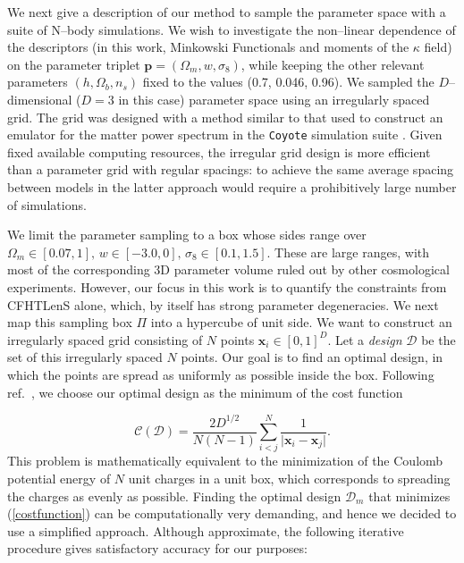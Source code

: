 \documentclass[reprint,aps,prd,superscriptaddress,showkeys,showpacs]{revtex4-1}
\begin{document}
We next give a description of our method to sample the parameter space
with a suite of N--body simulations. We wish to investigate the
non--linear dependence of the descriptors (in this work, Minkowski
Functionals and moments of the $\kappa$ field) on the parameter
triplet $\mathbf{p}=(\Omega_m,w,\sigma_8)$, while keeping the other
relevant parameters $(h,\Omega_b,n_s)$ fixed to the values (0.7,
0.046, 0.96). 
We sampled the $D$--dimensional ($D=3$ in this case) parameter space
using an irregularly spaced grid. The grid was designed with a method
similar to that used to construct an emulator for the matter power
spectrum in the \texttt{Coyote} simulation suite \citep{coyote2}.
Given fixed available computing resources, the irregular grid design
is more efficient than a parameter grid with regular spacings: to
achieve the same average spacing between models in the latter approach
would require a prohibitively large number of simulations.

We limit the parameter sampling to a box whose sides range over
$\Omega_m\in[0.07,1],\,w\in[-3.0,0],\,\sigma_8\in[0.1,1.5]$.  These
are large ranges, with most of the corresponding 3D parameter volume
ruled out by other cosmological experiments. However, our focus in
this work is to quantify the constraints from CFHTLenS alone, which,
by itself has strong parameter degeneracies.
We next map this sampling box $\Pi$ into a hypercube of unit side. We
want to construct an irregularly spaced grid consisting of $N$ points
$\mathbf{x}_i\in[0,1]^D$. Let a \textit{design} $\mathcal{D}$ be the
set of this irregularly spaced $N$ points. Our goal is to find an
optimal design, in which the points are spread as uniformly as
possible inside the box. Following ref.~\citep{coyote2}, we choose our
optimal design as the minimum of the cost function

\begin{equation}
\label{costfunction}
\mathcal{C}(\mathcal{D}) = \frac{2D^{1/2}}{N(N-1)}\sum_{i<j}^N\frac{1}{\vert\mathbf{x}_i-\mathbf{x}_j\vert}.
\end{equation} 
%
This problem is mathematically equivalent to the minimization of the
Coulomb potential energy of $N$ unit charges in a unit box, which
corresponds to spreading the charges as evenly as possible.
Finding the optimal design $\mathcal{D}_m$ that minimizes
(\ref{costfunction}) can be computationally very demanding, and hence
we decided to use a simplified approach. Although approximate, the
following iterative procedure gives satisfactory accuracy for our purposes:
\end{document}
